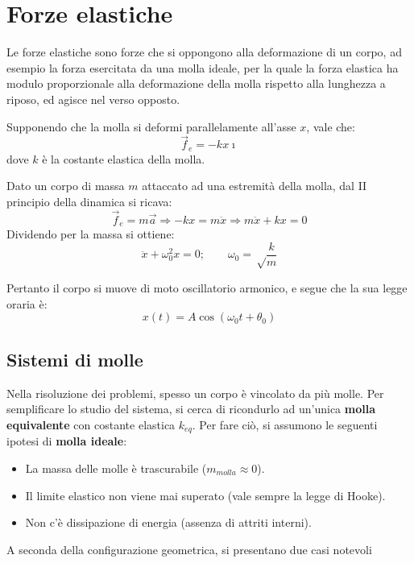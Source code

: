 \documentclass[11pt, a4paper, openright]{book}
\theoremstyle{plain}
\theoremstyle{definition}
\begin{document}
\newpage

\section{Forze elastiche}
Le forze elastiche sono forze che si oppongono alla deformazione di un corpo, ad esempio la forza esercitata da una molla ideale, per la quale la forza elastica ha modulo proporzionale alla deformazione della molla rispetto alla lunghezza a riposo, ed agisce nel verso opposto.

Supponendo che la molla si deformi parallelamente all'asse $x$, vale che:
\[\vec{f}_e = -kx\hat{\imath}\]
dove $k$ è la costante elastica della molla.

Dato un corpo di massa $m$ attaccato ad una estremità della molla, dal II principio della dinamica si ricava:
\[\vec{f}_e = m\vec{a} \Longrightarrow -kx = m\ddot{x} \Longrightarrow m\ddot{x} + kx = 0\]
Dividendo per la massa si ottiene:
\[\ddot{x} + \omega_0^2x = 0; \quad \quad \omega_0 = \sqrt\frac{k}{m}\]

Pertanto il corpo si muove di moto oscillatorio armonico, e segue che la sua legge oraria è:
\[x(t) = A\cos(\omega_0t + \theta_0)\]

\subsection{Sistemi di molle}
Nella risoluzione dei problemi, spesso un corpo è vincolato da più molle. Per semplificare lo studio del sistema, si cerca di ricondurlo ad un'unica \textbf{molla equivalente} con costante elastica $k_{eq}$. Per fare ciò, si assumono le seguenti ipotesi di \textbf{molla ideale}:
\begin{itemize}
    \item La massa delle molle è trascurabile ($m_{molla} \approx 0$).
    \item Il limite elastico non viene mai superato (vale sempre la legge di Hooke).
    \item Non c'è dissipazione di energia (assenza di attriti interni).
\end{itemize}
A seconda della configurazione geometrica, si presentano due casi notevoli
\end{document}
